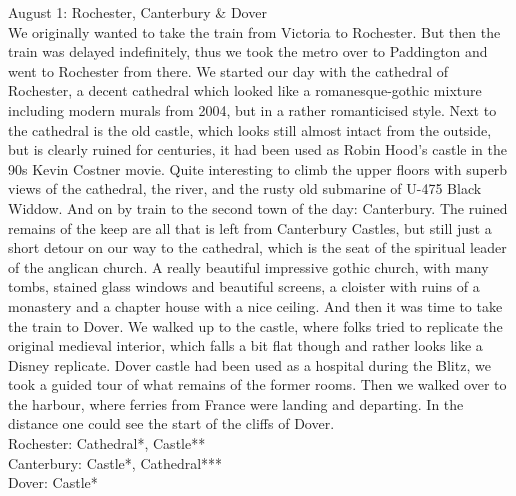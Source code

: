 August 1: Rochester, Canterbury \& Dover\\
We originally wanted to take the train from Victoria to Rochester. But then the train was delayed indefinitely, thus we took the metro over to Paddington and went to Rochester from there. We started our day with the cathedral of Rochester, a decent cathedral which looked like a romanesque-gothic mixture including modern murals from 2004, but in a rather romanticised style. Next to the cathedral is the old castle, which looks still almost intact from the outside, but is clearly ruined for centuries, it had been used as Robin Hood's castle in the 90s Kevin Costner movie. Quite interesting to climb the upper floors with superb views of the cathedral, the river, and the rusty old submarine of U-475 Black Widdow. And on by train to the second town of the day: Canterbury. The ruined remains of the keep are all that is left from Canterbury Castles, but still just a short detour on our way to the cathedral, which is the seat of the spiritual leader of the anglican church. A really beautiful impressive gothic church, with many tombs, stained glass windows and beautiful screens, a cloister with ruins of a monastery and a chapter house with a nice ceiling. And then it was time to take the train to Dover. We walked up to the castle, where folks tried to replicate the original medieval interior, which falls a bit flat though and rather looks like a Disney replicate. Dover castle had been used as a hospital during the Blitz, we took a guided tour of what remains of the former rooms. Then we walked over to the harbour, where ferries from France were landing and departing. In the distance one could see the start of the cliffs of Dover.\\

Rochester: Cathedral*, Castle**\\
Canterbury: Castle*, Cathedral***\\
 Dover: Castle*\\

